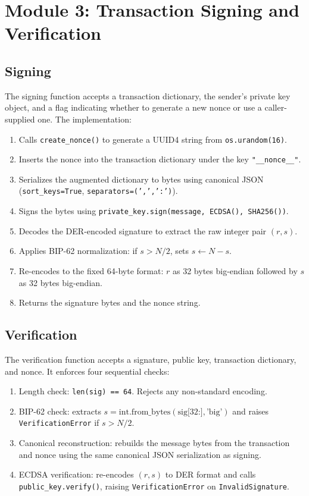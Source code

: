 \documentclass[12pt,a4paper]{report}
\begin{document}
\section{Module 3: Transaction Signing and Verification}

\subsection{Signing}

The signing function accepts a transaction dictionary, the sender's private key object,
and a flag indicating whether to generate a new nonce or use a caller-supplied one. The
implementation:

\begin{enumerate}[label=\arabic*.]
  \item Calls \texttt{create\_nonce()} to generate a UUID4 string from \texttt{os.urandom(16)}.
  \item Inserts the nonce into the transaction dictionary under the key \texttt{"\_\_nonce\_\_"}.
  \item Serializes the augmented dictionary to bytes using canonical JSON
        (\texttt{sort\_keys=True}, \texttt{separators=(',',':')}).
  \item Signs the bytes using \texttt{private\_key.sign(message, ECDSA(), SHA256())}.
  \item Decodes the DER-encoded signature to extract the raw integer pair $(r, s)$.
  \item Applies BIP-62 normalization: if $s > N/2$, sets $s \leftarrow N - s$.
  \item Re-encodes to the fixed 64-byte format: $r$ as 32 bytes big-endian followed by
        $s$ as 32 bytes big-endian.
  \item Returns the signature bytes and the nonce string.
\end{enumerate}

\subsection{Verification}

The verification function accepts a signature, public key, transaction dictionary, and nonce.
It enforces four sequential checks:

\begin{enumerate}[label=\arabic*.]
  \item Length check: \texttt{len(sig) == 64}. Rejects any non-standard encoding.
  \item BIP-62 check: extracts $s = \text{int.from\_bytes}(\text{sig[32:]}, \text{'big'})$
        and raises \texttt{VerificationError} if $s > N/2$.
  \item Canonical reconstruction: rebuilds the message bytes from the transaction and
        nonce using the same canonical JSON serialization as signing.
  \item ECDSA verification: re-encodes $(r, s)$ to DER format and calls
        \texttt{public\_key.verify()}, raising \texttt{VerificationError} on
        \texttt{InvalidSignature}.
\end{enumerate}
\end{document}
